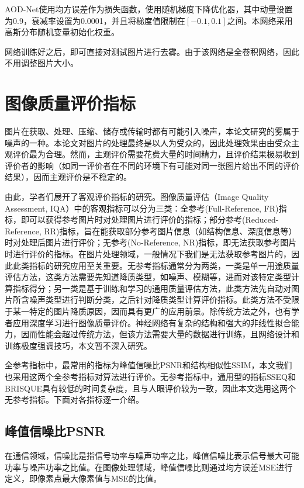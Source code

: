 \documentclass[a4paper, 12pt, oneside]{report}
\begin{document}
{AOD-Net使用均方误差作为损失函数，使用随机梯度下降优化器，其中动量设置为0.9，衰减率设置为0.0001，并且将梯度值限制在$[-0.1, 0.1]$之间。本网络采用高斯分布随机变量初始化权重。
	
网络训练好之后，即可直接对测试图片进行去雾。由于该网络是全卷积网络，因此不用调整图片大小。

\section{图像质量评价指标\quad}
图片在获取、处理、压缩、储存或传输时都有可能引入噪声，本论文研究的雾属于噪声的一种。本论文对图片的处理最终是以人为受众的，因此处理效果由由受众主观评价最为合理。然而，主观评价需要花费大量的时间精力，且评价结果极易收到评价者的影响（如同一评价者在不同的环境下有可能对同一张图片给出不同的评价结果），因而主观评价是不稳定的。

由此，学者们展开了客观评价指标的研究。图像质量评估（Image Quality Assessment, IQA）中的客观指标可以分为三类\cite{ref24}：全参考(Full-Reference, FR)指标，即可以获得参考图片时对处理图片进行评价的指标；部分参考(Reduced-Reference, RR)指标，旨在能获取部分参考图片信息（如结构信息、深度信息等）时对处理后图片进行评价；无参考(No-Reference, NR)指标，即无法获取参考图片时进行评价的指标。在图片处理领域，一般情况下我们是无法获取参考图片的，因此此类指标的研究应用至关重要。无参考指标通常分为两类，一类是单一用途质量评估方法，这类方法需要先知道降质类型，如噪声、模糊等，进而对该特定类型计算指标得分；另一类是基于训练和学习的通用质量评估方法，此类方法先自动对图片所含噪声类型进行判断分类，之后针对降质类型计算评价指标。此类方法不受限于某一特定的图片降质原因，因而具有更广的应用前景。除传统方法之外，也有学者应用深度学习进行图像质量评价。神经网络有复杂的结构和强大的非线性拟合能力，因而性能会超过传统方法，但该方法需要大量的数据进行训练，且网络设计和训练极度强调技巧，本文暂不深入研究。

全参考指标中，最常用的指标为峰值信噪比PSNR和结构相似性SSIM，本文我们也采用这两个全参考指标对算法进行评价。无参考指标中，通用型的指标SSEQ和BRISQUE具有较低的时间复杂度，且与人眼评价较为一致，因此本文选用这两个无参考指标。下面对各指标逐一介绍。

\subsection{峰值信噪比PSNR\quad}

在通信领域，信噪比是指信号功率与噪声功率之比，峰值信噪比表示信号最大可能功率与噪声功率之比值。在图像处理领域，峰值信噪比则通过均方误差MSE进行定义，即像素点最大像素值与MSE的比值。

}
\end{document}
